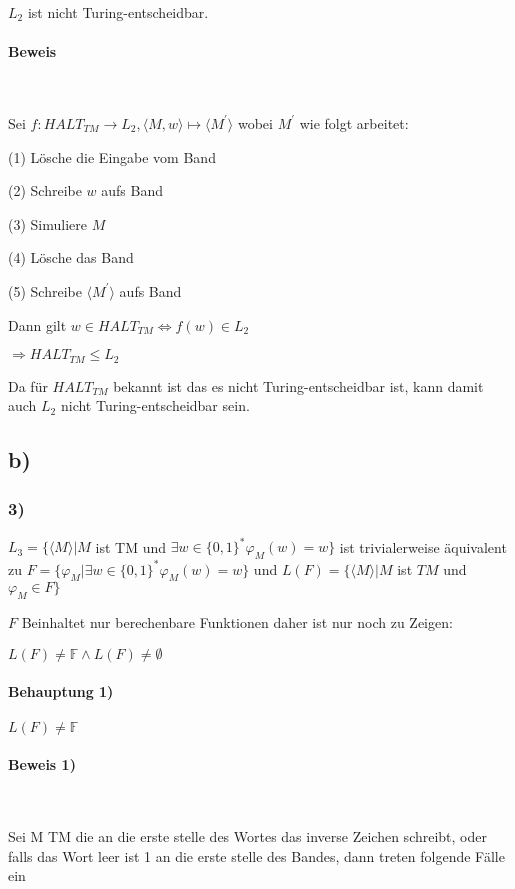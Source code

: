 $L_2$ ist nicht Turing-entscheidbar.

\paragraph*{Beweis}~

Sei $f: HALT_{TM} \to L_2, \langle M, w \rangle \mapsto \langle M^\prime \rangle$ wobei $M^\prime$
wie folgt arbeitet:

(1) Lösche die Eingabe vom Band

(2) Schreibe $w$ aufs Band

(3) Simuliere $M$ 

(4) Lösche das Band

(5) Schreibe $\langle M^\prime \rangle$ aufs Band

Dann gilt $w \in HALT_{TM} \Leftrightarrow f(w) \in L_2$

$\Rightarrow HALT_{TM} \leq L_2$ 

Da für $HALT_{TM}$ bekannt ist das es nicht Turing-entscheidbar ist, kann damit auch $L_2$ nicht Turing-entscheidbar sein.  

\subsection*{b)}

\subsubsection*{3)}
$L_3=\{\langle M \rangle | M$ ist TM und $\exists w \in \{0,1\}^* \varphi_M(w)=w\}$ ist trivialerweise äquivalent zu $F = \{ \varphi_M | \exists w \in \{0,1\}^* \varphi_M(w)=w \}$
und $L(F)=\{ \langle M \rangle | M$ ist $TM$ und $\varphi_M \in F \}$

$F$ Beinhaltet nur berechenbare Funktionen daher ist nur noch zu Zeigen:

$L(F) \neq \mathbb{F} \wedge L(F) \neq \emptyset $

\paragraph*{Behauptung 1)}
$L(F) \neq \mathbb{F}$

\paragraph*{Beweis 1)}~

Sei M TM die an die erste stelle des Wortes das inverse Zeichen schreibt, oder falls das Wort leer ist 1 an die erste stelle des Bandes, dann treten folgende Fälle ein 
